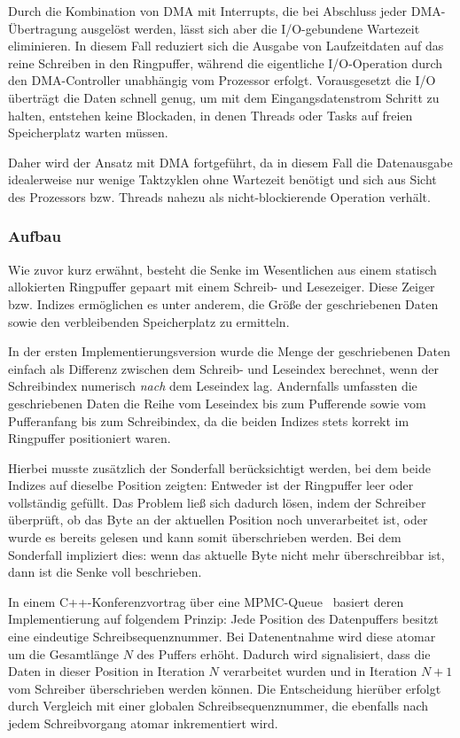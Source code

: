 Durch die Kombination von DMA mit Interrupts, die bei Abschluss jeder
DMA-Übertragung ausgelöst werden, lässt sich aber die I/O-gebundene Wartezeit
eliminieren. In diesem Fall reduziert sich die Ausgabe von Laufzeitdaten auf das
reine Schreiben in den Ringpuffer, während die eigentliche I/O-Operation durch
den DMA-Controller unabhängig vom Prozessor erfolgt. Vorausgesetzt die I/O
überträgt die Daten schnell genug, um mit dem Eingangsdatenstrom Schritt zu
halten, entstehen keine Blockaden, in denen Threads oder Tasks auf freien
Speicherplatz warten müssen.

Daher wird der Ansatz mit DMA fortgeführt, da in diesem Fall die Datenausgabe
idealerweise nur wenige Taktzyklen ohne Wartezeit benötigt und sich aus Sicht
des Prozessors bzw. Threads nahezu als nicht-blockierende Operation verhält.

\subsubsection{Aufbau}

Wie zuvor kurz erwähnt, besteht die Senke im Wesentlichen aus einem statisch
allokierten Ringpuffer gepaart mit einem Schreib- und Lesezeiger. Diese Zeiger
bzw. Indizes ermöglichen es unter anderem, die Größe der geschriebenen Daten
sowie den verbleibenden Speicherplatz zu ermitteln.

In der ersten Implementierungsversion wurde die Menge der geschriebenen Daten
einfach als Differenz zwischen dem Schreib- und Leseindex berechnet, wenn der
Schreibindex numerisch \textit{nach} dem Leseindex lag. Andernfalls umfassten
die geschriebenen Daten die Reihe vom Leseindex bis zum Pufferende sowie vom
Pufferanfang bis zum Schreibindex, da die beiden Indizes stets korrekt im
Ringpuffer positioniert waren.

Hierbei musste zusätzlich der Sonderfall berücksichtigt werden, bei dem beide
Indizes auf dieselbe Position zeigten: Entweder ist der Ringpuffer leer oder
vollständig gefüllt. Das Problem ließ sich dadurch lösen, indem der Schreiber
überprüft, ob das Byte an der aktuellen Position noch unverarbeitet ist, oder
wurde es bereits gelesen und kann somit überschrieben werden. Bei dem Sonderfall
impliziert dies: wenn das aktuelle Byte nicht mehr überschreibbar ist, dann ist
die Senke voll beschrieben.

In einem C++-Konferenzvortrag über eine
\ac{MPMC}-Queue~\cite{CppCon2024LockFreeQueue} basiert deren Implementierung auf
folgendem Prinzip: Jede Position des Datenpuffers besitzt eine eindeutige
Schreibsequenznummer. Bei Datenentnahme wird diese atomar um die Gesamtlänge $N$
des Puffers erhöht. Dadurch wird signalisiert, dass die Daten in dieser Position
in Iteration $N$ verarbeitet wurden und in Iteration $N+1$ vom Schreiber
überschrieben werden können. Die Entscheidung hierüber erfolgt durch Vergleich
mit einer globalen Schreibsequenznummer, die ebenfalls nach jedem Schreibvorgang
atomar inkrementiert wird.

